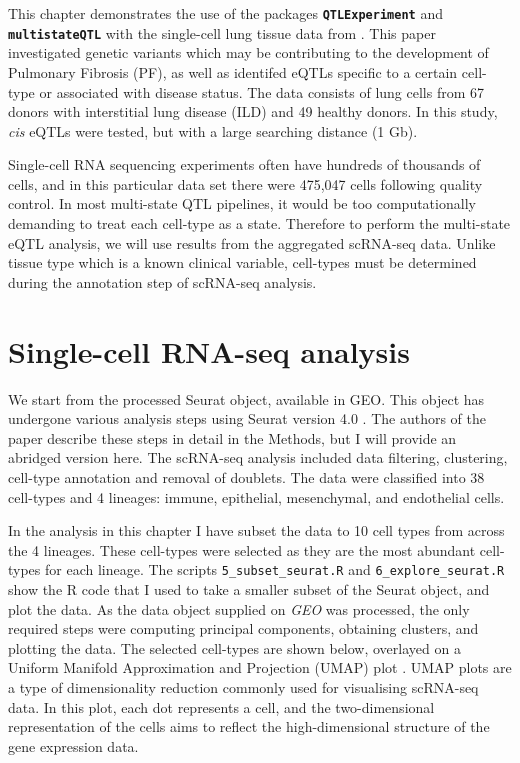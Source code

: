 \documentclass[
]{article}
\author{}
\date{\vspace{-2.5em}}
\begin{document}
\newcommand\textpkg[1]{\textbf{\texttt{#1}}}

This chapter demonstrates the use of the packages
\textbf{\texttt{QTLExperiment}} and \textbf{\texttt{multistateQTL}} with
the single-cell lung tissue data from \textcite{Natri_2024_lung}. This
paper investigated genetic variants which may be contributing to the
development of Pulmonary Fibrosis (PF), as well as identifed eQTLs
specific to a certain cell-type or associated with disease status. The
data consists of lung cells from 67 donors with interstitial lung
disease (ILD) and 49 healthy donors. In this study, \emph{cis} eQTLs
were tested, but with a large searching distance (1 Gb).

Single-cell RNA sequencing experiments often have hundreds of thousands
of cells, and in this particular data set there were 475,047 cells
following quality control. In most multi-state QTL pipelines, it would
be too computationally demanding to treat each cell-type as a state.
Therefore to perform the multi-state eQTL analysis, we will use results
from the aggregated scRNA-seq data. Unlike tissue type which is a known
clinical variable, cell-types must be determined during the annotation
step of scRNA-seq analysis.

\hypertarget{single-cell-rna-seq-analysis}{%
\section{Single-cell RNA-seq
analysis}\label{single-cell-rna-seq-analysis}}

We start from the processed Seurat object, available in GEO. This object
has undergone various analysis steps using Seurat version 4.0
\autocite{Hao_2021_Seurat}. The authors of the
\textcite{Natri_2024_lung} paper describe these steps in detail in the
Methods, but I will provide an abridged version here. The scRNA-seq
analysis included data filtering, clustering, cell-type annotation and
removal of doublets. The data were classified into 38 cell-types and 4
lineages: immune, epithelial, mesenchymal, and endothelial cells.

In the analysis in this chapter I have subset the data to 10 cell types
from across the 4 lineages. These cell-types were selected as they are
the most abundant cell-types for each lineage. The scripts
\texttt{5\_subset\_seurat.R} and \texttt{6\_explore\_seurat.R} show the
R code that I used to take a smaller subset of the Seurat object, and
plot the data. As the data object supplied on \emph{GEO} was processed,
the only required steps were computing principal components, obtaining
clusters, and plotting the data. The selected cell-types are shown
below, overlayed on a Uniform Manifold Approximation and Projection
(UMAP) plot \autocite{McInnes_2018_UMAP}. UMAP plots are a type of
dimensionality reduction commonly used for visualising scRNA-seq data.
In this plot, each dot represents a cell, and the two-dimensional
representation of the cells aims to reflect the high-dimensional
structure of the gene expression data.
\end{document}
